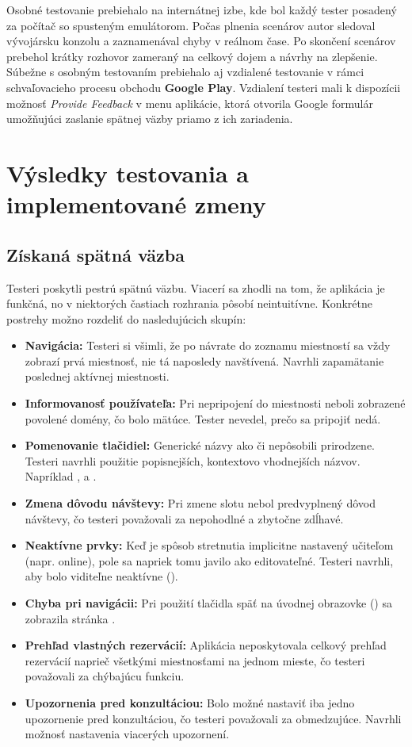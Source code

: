Osobné testovanie prebiehalo na internátnej izbe, kde bol každý 
tester posadený za počítač so spusteným emulátorom. Počas plnenia 
scenárov autor sledoval vývojársku konzolu a zaznamenával chyby 
v reálnom čase. Po skončení scenárov prebehol krátky rozhovor 
zameraný na celkový dojem a návrhy na zlepšenie. Súbežne 
s osobným testovaním prebiehalo aj vzdialené testovanie v rámci 
schvaľovacieho procesu obchodu \textbf{Google Play}. Vzdialení 
testeri mali k dispozícii možnosť \textit{Provide Feedback} 
v menu aplikácie, ktorá otvorila Google formulár umožňujúci 
zaslanie spätnej väzby priamo z ich zariadenia.

\section{Výsledky testovania a implementované zmeny}
\subsection{Získaná spätná väzba}

Testeri poskytli pestrú spätnú väzbu. Viacerí sa zhodli na tom, že aplikácia je funkčná, no v niektorých častiach rozhrania pôsobí neintuitívne. Konkrétne postrehy možno rozdeliť do nasledujúcich skupín:

\begin{itemize}
    \item \textbf{Navigácia:} Testeri si všimli, že po návrate do zoznamu miestností sa vždy zobrazí prvá miestnosť, nie tá naposledy navštívená. Navrhli zapamätanie poslednej aktívnej miestnosti.
    \item \textbf{Informovanosť používateľa:} Pri nepripojení do miestnosti neboli zobrazené povolené domény, čo bolo mätúce. Tester nevedel, prečo sa pripojiť nedá.
    \item \textbf{Pomenovanie tlačidiel:} Generické názvy ako  či  nepôsobili prirodzene. Testeri navrhli použitie popisnejších, kontextovo vhodnejších názvov. Napríklad ,  a .
    \item \textbf{Zmena dôvodu návštevy:} Pri zmene slotu nebol predvyplnený dôvod návštevy, čo testeri považovali za nepohodlné a zbytočne zdĺhavé.
    \item \textbf{Neaktívne prvky:} Keď je spôsob stretnutia implicitne nastavený učiteľom (napr. online), pole sa napriek tomu javilo ako editovateľné. Testeri navrhli, aby bolo viditeľne neaktívne ().
    \item \textbf{Chyba pri navigácii:} Pri použití tlačidla späť na úvodnej obrazovke () sa zobrazila stránka .
    \item \textbf{Prehľad vlastných rezervácií:} Aplikácia neposkytovala celkový prehľad rezervácií naprieč všetkými miestnosťami na jednom mieste, čo testeri považovali za chýbajúcu funkciu.
    \item \textbf{Upozornenia pred konzultáciou:} Bolo možné nastaviť iba jedno upozornenie pred konzultáciou, čo testeri považovali za obmedzujúce. Navrhli možnosť nastavenia viacerých upozornení.
\end{itemize}



